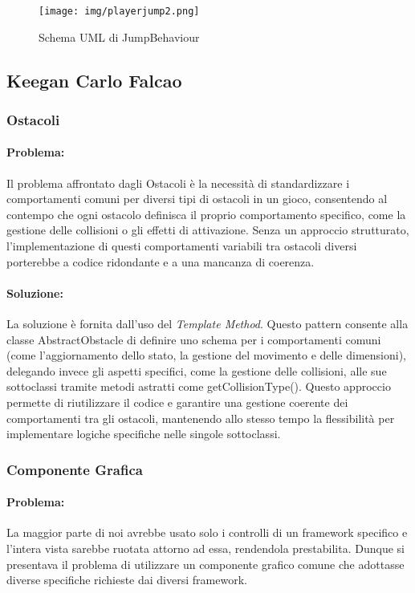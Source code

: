 \documentclass[a4paper,12pt]{report}
\begin{document}
	\begin{figure}[H]
		\centering
		\texttt{[image: img/playerjump2.png]}
		\caption{Schema UML di JumpBehaviour}
		\label{img:jump}
	\end{figure}
	
	
	\subsection{Keegan Carlo Falcao}
	\subsubsection{Ostacoli}
	
	\paragraph{Problema:} Il problema affrontato dagli Ostacoli è la necessità di standardizzare i comportamenti comuni per diversi tipi di ostacoli in un gioco, consentendo al contempo che ogni ostacolo definisca il proprio comportamento specifico, come la gestione delle collisioni o gli effetti di attivazione. Senza un approccio strutturato, l'implementazione di questi comportamenti variabili tra ostacoli diversi porterebbe a codice ridondante e a una mancanza di coerenza.
	
	\paragraph{Soluzione:}La soluzione è fornita dall'uso del \textit{Template Method}. Questo pattern consente alla classe AbstractObstacle di definire uno schema per i comportamenti comuni (come l'aggiornamento dello stato, la gestione del movimento e delle dimensioni), delegando invece gli aspetti specifici, come la gestione delle collisioni, alle sue sottoclassi tramite metodi astratti come getCollisionType(). Questo approccio permette di riutilizzare il codice e garantire una gestione coerente dei comportamenti tra gli ostacoli, mantenendo allo stesso tempo la flessibilità per implementare logiche specifiche nelle singole sottoclassi.
	
	\subsubsection{Componente Grafica}
	
	\paragraph{Problema:} La maggior parte di noi avrebbe usato solo i controlli di un framework specifico e l'intera vista sarebbe ruotata attorno ad essa, rendendola prestabilita. Dunque si presentava il problema di utilizzare un componente grafico comune che adottasse diverse specifiche richieste dai diversi framework.
	
\end{document}
